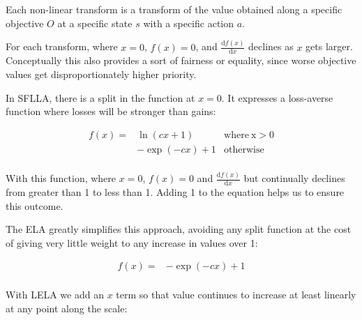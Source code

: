 Each non-linear transform is a transform of the value obtained along a specific objective $O$ at a specific state $s$ with a specific action $a$.

For each transform, where $x=0$, $f(x)=0$, and $\frac{\mathrm{d} f(x) }{\mathrm{d} x}$ declines as $x$ gets larger. Conceptually this also provides a sort of fairness or equality, since worse objective values get disproportionately higher priority.





In SFLLA, there is a split in the function at $x=0$. It expresses a loss-averse function where losses will be stronger than gains:

\begin{align}
f(x)= & \ln(cx+1) & \mathrm{ where \: x>0} \\ \nonumber
  &  -\exp(-cx)+1 &  \mathrm{otherwise} \\ \nonumber
\end{align}

With this function, where $x=0$, $f(x)=0$ and $\frac{\mathrm{d} f(x) }{\mathrm{d} x}$ but continually declines from greater than 1 to less than 1. Adding 1 to the equation helps us to ensure this outcome.

The ELA greatly simplifies this approach, avoiding any split function at the cost of giving very little weight to any increase in values over 1:

\begin{align}
f(x)= &  -\exp(-cx)+1 \\ \nonumber
\end{align}

With LELA we add an $x$ term so that value continues to increase at least linearly at any point along the scale:


